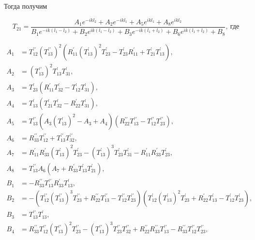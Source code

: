 \documentclass[a4 paper, 12 pt]{extarticle}
\begin{document}
   \pagebreak
   Тогда получим
   
   \begin{equation}
   \label{T21}
   T_{21} = 
   \frac{A_1 e^{-ikl_2} + A_2 e^{-ikl_1} + A_5 e^{ikl_1} + A_8 e^{ikl_2}}{B_1 e^{-ik\left(l_1-l_2\right)} + B_2 e^{ik\left(l_1-l_2\right)} + B_3 e^{-ik\left(l_1+l_2\right)} + B_6 e^{ik\left(l_1+l_2\right)}  + B_8}, \ \text{где}
   \end{equation}
   
   \[
   \begin{aligned}
   A_1 &= T_{12}^{\prime\prime} (T_{13}^{\prime\prime})^2 \left(R_{11}^\prime (T_{13}^\prime)^2 T_{23}^\prime - T_{23}^\prime R_{11}^\prime + T_{21}^\prime T_{13}^\prime\right) ,\\
   A_2 &= (T_{13}^{\prime\prime})^2 T_{13}^\prime T_{31}^\prime ,\\
   A_3 &= T_{23}^\prime \left(R_{11}^\prime T_{32}^\prime - T_{12}^\prime T_{31}^\prime\right) ,\\
   A_4 &= T_{13}^\prime \left(T_{21}^\prime T_{32}^\prime - R_{22}^\prime T_{31}^\prime\right) ,\\
   A_5 &= T_{13}^{\prime\prime} \left(A_3 (T_{13}^\prime)^2 - A_3 + A_4\right)\left(R_{22}^{\prime\prime} T_{13}^{\prime\prime} - T_{12}^{\prime\prime} T_{23}^{\prime\prime}\right) ,\\
   A_6 &= R_{33}^{\prime\prime} T_{12}^{\prime\prime} + T_{13}^{\prime\prime} T_{32}^{\prime\prime} ,\\
   A_7 &= R_{11}^\prime R_{33}^\prime (T_{13}^\prime)^2 T_{23}^\prime -(T_{13}^\prime)^3 T_{23}^\prime T_{31}^\prime - R_{11}^\prime R_{33}^\prime T_{23}^\prime,\\
   A_8 &= T_{13}^{\prime\prime} A_6 \left(A_7 + R_{33}^\prime T_{13}^\prime T_{21}^\prime\right) ,\\
   B_1 &= -R_{33}^{\prime\prime} T_{13}^{\prime\prime} R_{33}^\prime T_{13}^\prime ,\\
   B_2 &= -\left(T_{12}^{\prime\prime} (T_{13}^{\prime\prime})^3 T_{23}^{\prime\prime} + R_{22}^{\prime\prime} T_{13}^{\prime\prime} - T_{12}^{\prime\prime} T_{23}^{\prime\prime}\right)\left(T_{12}^\prime (T_{13}^\prime)^2 T_{23}^\prime + R_{22}^\prime T_{13}^\prime - T_{12}^\prime T_{23}^\prime\right) ,\\
   B_3 &=  T_{13}^{\prime\prime} T_{13}^\prime ,\\
   B_4 &= R_{33}^{\prime\prime} T_{12}^{\prime\prime} (T_{13}^{\prime\prime})^2 T_{23}^{\prime\prime} - (T_{13}^{\prime\prime})^3 T_{23}^{\prime\prime} T_{32}^{\prime\prime} + R_{22}^{\prime\prime} R_{33}^{\prime\prime} T_{13}^{\prime\prime} - R_{33}^{\prime\prime} T_{12}^{\prime\prime} T_{23}^{\prime\prime} ,\\

\end{aligned}\]
\end{document}
